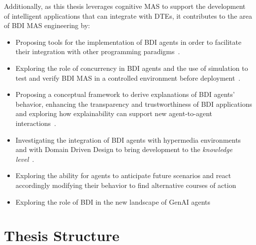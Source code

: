 Additionally, as this thesis leverages cognitive \ac{MAS} to support the development of intelligent applications that can integrate with \acp{DTE}, it contributes to the area of \ac{BDI} \ac{MAS} engineering by:  
\begin{itemize}
  \item Proposing tools for the implementation of \ac{BDI} agents in order to facilitate their integration with other programming paradigms~\cite{DBLP:journals/sncs/BaiardiBCP24,DBLP:conf/eumas/BaiardiBCP23,DBLP:conf/acsos/PianiniBBC24}.
  
  \item Exploring the role of concurrency in \ac{BDI} agents and the use of simulation to test and verify \ac{BDI} \ac{MAS} in a controlled environment before deployment~\cite{baiardi2025jaktasim,DBLP:conf/atal/BaiardiBCPOR24,DBLP:conf/emas/BaiardiBCPRO24}.
  
  \item Proposing a conceptual framework to derive explanations of \ac{BDI} agents' behavior, enhancing the transparency and trustworthiness of \ac{BDI} applications and exploring how explainability can support new agent-to-agent interactions~\cite{DBLP:journals/aamas/YanBHR25,DBLP:conf/woa/YanBHR23,beaumont2025explain,beaumont2025engineering}.

  \item Investigating the integration of \ac{BDI} agents with hypermedia environments and with Domain Driven Design to bring development to the \emph{knowledge level}~\cite{burattini2025gap,DBLP:conf/emas/BurattiniCGR23,DBLP:conf/emas/RicciBCC24,ricci2025concpeptual,DBLP:conf/emas/RicciBCC24,DBLP:conf/atal/LemeeBMC23,RAMANATHAN2022217}.

  \item Exploring the ability for agents to anticipate future scenarios and react accordingly modifying their behavior to find alternative courses of action \cite{DBLP:journals/aamas/HubnerBRM25,wesaac}

  \item Exploring the role of \ac{BDI} in the new landscape of \ac{GenAI} agents~\cite{DBLP:conf/atal/Ricci0ZBC24,Ciatto_Aguzzi_Battistini_Baiardi_Burattini_Ricci_2025}
\end{itemize}


\section*{Thesis Structure}

